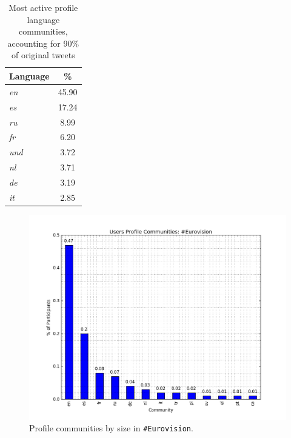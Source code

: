 \begin{table}[!htb]
\centering
\begin{tabular}{@{}lc}
\toprule
\textbf{Language} & \textbf{\%} \\ 
\midrule
{\emph{en}} & 45.90 \\
{\emph{es}} & 17.24 \\
{\emph{ru}} & 8.99 \\
{\emph{fr}} & 6.20 \\
{\emph{und}} & 3.72 \\
{\emph{nl}} & 3.71 \\
{\emph{de}} & 3.19 \\
{\emph{it}} & 2.85 \\ 
\bottomrule
\end{tabular}
\caption{Most active profile language
  communities, accounting for 90\% of original tweets}
\label{tbl:activelangs}
\end{table}

\begin{figure}[htb]
\centering
\includegraphics[width=\columnwidth]{images/eurovision_profile_size.png}
\caption{Profile communities by size in {\texttt{\#Eurovision}}.}
\label{fig:eurovisionprofilesize}
\end{figure}


